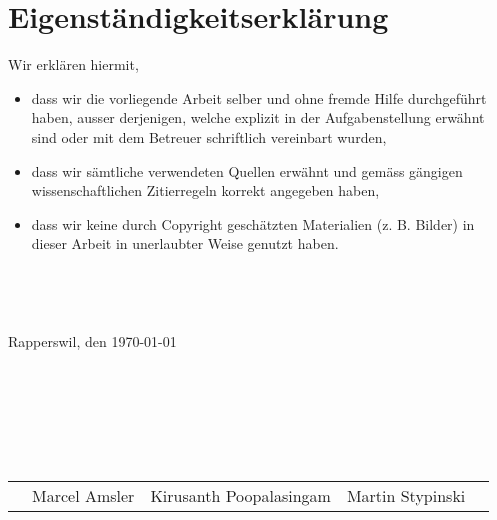 \cleardoublepage
{}
{}
\chapter*{Eigenständigkeitserklärung}

Wir erklären hiermit,
\begin{itemize}
	\item{dass wir die vorliegende Arbeit selber und ohne fremde Hilfe durchgeführt haben, ausser
derjenigen, welche explizit in der Aufgabenstellung erwähnt sind oder mit dem Betreuer
schriftlich vereinbart wurden,}
	\item{dass wir sämtliche verwendeten Quellen erwähnt und gemäss gängigen wissenschaftlichen
Zitierregeln korrekt angegeben haben,}
	\item{dass wir keine durch Copyright geschätzten Materialien (z. B. Bilder) in dieser Arbeit in
unerlaubter Weise genutzt haben.}
\end{itemize}
\begin{verbatim}




\end{verbatim}
Rapperswil, den \today
\begin{verbatim}







\end{verbatim}
\begin{tabular*}{\textwidth}{p{0cm}>{\centering\arraybackslash}m{4.8cm}>{\centering\arraybackslash}m{4.8cm}>{\centering\arraybackslash}m{4.8cm}p{0cm}}
	& Marcel Amsler & Kirusanth Poopalasingam & Martin Stypinski & \\
\end{tabular*}
